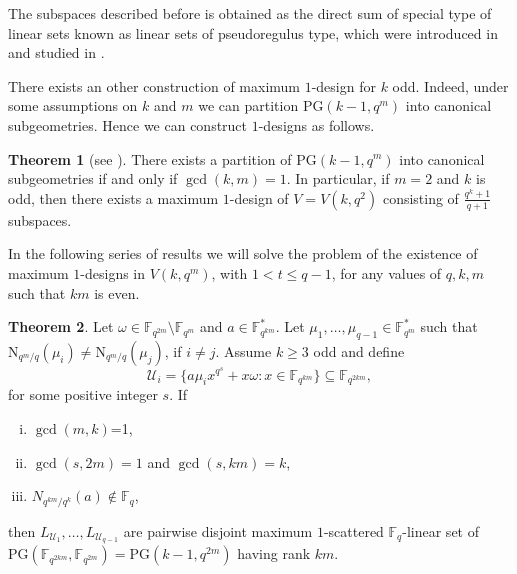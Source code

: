 \documentclass[11pt]{amsart}
\theoremstyle{definition}
\newtheorem{theorem}{Theorem}[section]
\newcommand{\F}{{\mathbb F}}
\newcommand{\U}{{\mathcal{U}}}
\newcommand{\PG}{\mathrm{PG}}
\newcommand{\N}{\mathrm{N}}
\begin{document}
{The subspaces described before is obtained as the direct sum of special type of linear sets known as linear sets of pseudoregulus type, which were introduced in \cite{marino2007fq} and studied in \cite{lavrauw2013scattered,lunardon2014maximum}.

There exists an other construction of maximum $1$-design for $k$ odd. Indeed, under some assumptions on $k$ and $m$ we can partition $\PG(k-1,q^m)$ into canonical subgeometries. Hence we can construct $1$-designs as follows.

\begin{theorem} [see \textnormal{\cite[Theorem 4.29]{hirschfeld1998projective} \cite[Theorem 5.21]{santonastaso2022subspace}}] %
There exists a partition of $\PG(k-1,q^m)$ into canonical subgeometries if and only if $\gcd(k,m)=1$. In particular, if $m=2$ and $k$ is odd, then there exists a maximum $1$-design of $V=V(k,q^2)$ consisting of $\frac{q^{k}+1}{q+1}$ subspaces.
\end{theorem}

In the following series of results we will solve the problem of the existence of maximum $1$-designs in $V(k,q^m)$, with $1 <t \leq q-1$, for any values of $q,k,m$ such that $km$ is even.


\begin{theorem} \label{th:constructiondisjoint2}
    Let $\omega \in \F_{q^{2m}} \setminus \F_{q^{m}}$ and $a \in \F_{q^{km}}^*$. Let $\mu_1,\ldots,\mu_{q-1} \in \F_{q^m}^*$ such that $\N_{q^m/q}(\mu_i) \neq \N_{q^m/q}(\mu_j)$, if $i \neq j$. Assume $k \geq 3$ odd and define
\[\U_i=\{ a\mu_ix^{q^s}+x\omega \colon x \in  \F_{q^{km}}\} \subseteq \F_{q^{2km}},\]
for some positive integer $s$.
If  \begin{enumerate}[(i)]
       \item $\gcd(m,k)$=1,
       \item $\gcd(s,2m)=1$ and $\gcd(s,km)=k$,
       \item $N_{q^{km}/q^k}(a) \notin \F_q$,
   \end{enumerate} 
then $L_{\U_1},\ldots,L_{\U_{q-1}}$ are pairwise disjoint maximum $1$-scattered $\F_q$-linear set of $\PG(\F_{q^{2km}},\F_{q^{2m}})=\PG(k-1,q^{2m})$ having rank $km$.
\end{theorem}

}
\end{document}

